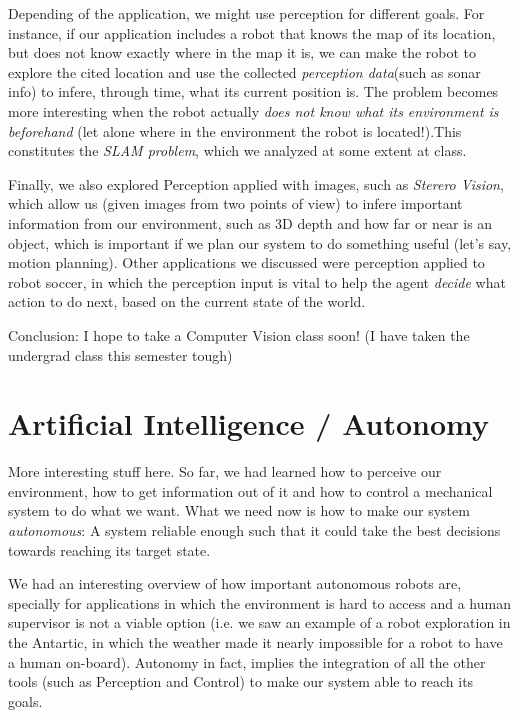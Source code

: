 \documentclass[10pt,a4paper]{article}
\begin{document}
Depending of the application, we might use perception for different goals. For instance, if our application includes a robot that  knows the map of its location, but does not know exactly where in the map it is, we can make the robot to explore the cited location and use the collected \textit{perception data}(such as sonar info) to infere, through time, what its current position is. The problem becomes more interesting when the robot actually \textit{does not know what its environment is beforehand} (let alone where in the environment the robot is located!).This constitutes the \textit{SLAM problem}, which we analyzed at some extent at class.

Finally, we also explored Perception applied with images, such as \textit{Sterero Vision}, which allow us (given images from two points of view) to infere important information from our environment, such as 3D depth and how far or near is an object, which is important if we plan our system to do something useful (let's say, motion planning). Other applications we discussed were perception applied to robot soccer, in which the perception input is vital to help the agent \textit{decide} what action to do next, based on the current state of the world.
\medskip

Conclusion: I hope to take a Computer Vision class soon! (I have taken the undergrad class this semester tough)

\section{Artificial Intelligence / Autonomy}
More interesting stuff here. So far, we had learned how to perceive our environment, how to get information out of it and how to control a mechanical system to do what we want. What we need now is how to make our system \textit{autonomous}: A system reliable enough such that it could take the best decisions towards reaching its target state.

We had an interesting overview of how important autonomous robots are, specially for applications in which the environment is hard to access and a human supervisor is not a viable option (i.e. we saw an example of a robot exploration in the Antartic, in which the weather made it nearly impossible for a robot to have a human on-board). Autonomy in fact, implies the integration of all the other tools (such as Perception and Control) to make our system able to reach its goals.
\end{document}
